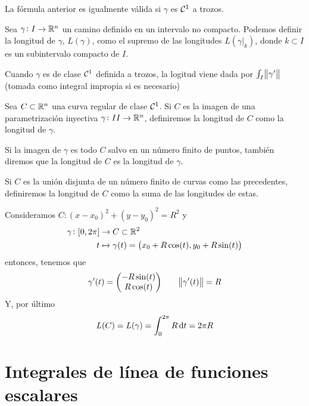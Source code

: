 \begin{obs}
    La fórmula anterior es igualmente válida si $\gamma$ es $\mathcal{C}^1$ a trozos.
\end{obs}

\begin{defi}
    Sea $\gamma \colon I \to \mathbb{R}^n$ un camino definido en un intervalo no compacto. Podemos definir la longitud de $\gamma$, $L(\gamma)$,
    como el supremo de las longitudes $L(\gamma\vert_{k})$, donde $k \subset I$ es un subintervalo compacto de $I$.

    Cuando $\gamma$ es de clase $\mathcal{C}^1$ definida a trozos, la logitud viene dada por $\int_I \norm{\gamma^\prime}$ (tomada como integral impropia
    si es necesario)
\end{defi}


\begin{defi} \label{defi:observaciones_curvas}
    Sea $C \subset \mathbb{R}^n$ una curva regular de clase $\mathcal{C}^1$. Si $C$ es la imagen de una parametrización inyectiva $\gamma \colon II \to \mathbb{R}^n$,
    definiremos la longitud de $C$ como la longitud de $\gamma$.

    Si la imagen de $\gamma$ es todo $C$ salvo en un número finito de puntos, tambi\'en diremos que la longitud de $C$ es la longitud de $\gamma$.

    Si $C$ es la unión disjunta de un número finito de curvas como las precedentes, definiremos la longitud de $C$ como la suma de las longitudes
    de estas.
\end{defi}

\begin{example}
    Consideramos $C \colon \left( x - x_0 \right)^2 + \left( y - y_0 \right)^2 = R^2$ y
    \[
        \begin{aligned}
            \gamma \colon [0,2\pi] &\to C \subset \mathbb{R}^2 \\
            t &\mapsto \gamma(t) = \left( x_0 + R\cos(t), y_0 + R\sin(t) \right)
        \end{aligned}
    \]
    entonces, tenemos que
    \[
        \gamma^\prime(t) = \begin{pmatrix} -R\sin(t) \\ R \cos(t) \end{pmatrix} \qquad
        \norm{\gamma^\prime(t)} = R
    \]
    Y, por último
    \[
        L(C) = L(\gamma) = \int^{2\pi}_0 R \dif t = 2\pi R
    \]
\end{example}

\section{Integrales de línea de funciones escalares}

